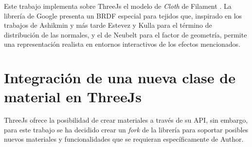 Este trabajo implementa sobre ThreeJs el modelo de \textit{Cloth} de Filament \autocite{filament}. La librer\'ia de Google
presenta un BRDF especial para tejidos que, inspirado en los trabajos de Ashikmin \autocite{ashikhmin} y m\'as
tarde Estevez y Kulla \autocite{sheenbrdf} para el t\'ermino de distribuci\'on de las normales, y el de Neubelt \autocite{theorder}
para el factor de geometr\'ia, permite una representaci\'on realista en entornos interactivos de los efectos mencionados.








\section{Integraci\'on de una nueva clase de material en ThreeJs}
ThreeJs ofrece la posibilidad de crear materiales a trav\'es de su API, sin embargo, para este trabajo se ha decidido
crear un \textit{fork} de la librer\'ia para soportar posibles nuevos materiales y funcionalidades que se requieran
espec\'ificamente de Author.\\

